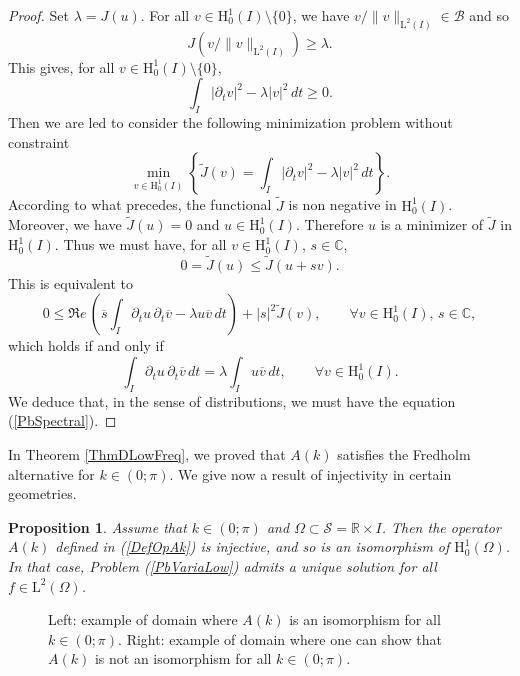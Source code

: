 \documentclass[11pt,a4paper]{report}
\newcommand{\Om}{\Omega}
\newcommand{\mrm}[1]{\mathrm{#1}}
\newcommand{\Cplx}{\mathbb{C}}
\newcommand{\R}{\mathbb{R}}
\newcommand{\mL}{\mrm{L}}
\newcommand{\mH}{\mrm{H}}
\newtheorem{proposition}[theorem]{Proposition}
\begin{document}
\begin{proof}
\newline
Set $\lambda=J(u)$. For all $v\in \mH^1_0(I)\setminus\{0\}$, we have $v/\|v\|_{\mL^2(I)}\in \mathscr{B}$ and so 
\[
J(v/\|v\|_{\mL^2(I)}) \ge \lambda.
\]
This gives, for all $v\in \mH^1_0(I)\setminus\{0\}$,
\[
\int_I |\partial_t v|^2 - \lambda  |v|^2\,dt \ge0.
\]
Then we are led to consider the following minimization problem without constraint 
\[
\min_{v\in \mH^1_0(I)}\left\{\tilde J(v)=\int_I |\partial_t v|^2 - \lambda  |v|^2\,dt\right\}.
\]
According to what precedes, the functional $\tilde J$ is non negative in $\mH^1_0(I)$. Moreover, we have $\tilde J(u)=0$ and $u\in \mH^1_0(I)$. Therefore $u$  is a minimizer of $\tilde J$ in $\mH^1_0(I)$. Thus we must have, for all $v\in \mH^1_0(I)$, $s\in\Cplx$,
\[
0=\tilde J(u) \le \tilde J(u+sv).
\]
This is equivalent to
\[
0 \le \Re e\,\left(\overline{s}\int_I \partial_t u\,\partial_t \overline{v}-\lambda   u\overline{v}\,dt\right)+|s|^2\tilde J(v),\qquad\forall v\in  \mH^1_0(I),\,s\in\Cplx,
\]
which holds if and only if
\[
\int_I \partial_t u\,\partial_t \overline{v}\,dt=\lambda\int_I   u\overline{v}\,dt,\qquad\forall v\in  \mH^1_0(I).
\]
We deduce that, in the sense of distributions, we must have the equation (\ref{PbSpectral}). 
\end{proof}

\noindent In Theorem \ref{ThmDLowFreq}, we proved that $A(k)$ satisfies the Fredholm alternative for $k\in(0;\pi)$. We give now a result of injectivity in certain geometries.

\begin{proposition}\label{PropInjD}
Assume that $k\in(0;\pi)$ and $\Om\subset \mathcal{S}=\R\times I$. Then the operator $A(k)$ defined in (\ref{DefOpAk}) is injective, and so is an isomorphism of $\mH^1_0(\Om)$. In that case, Problem (\ref{PbVariaLow}) admits a unique solution for all $f\in\mL^2(\Om)$.
\end{proposition}

\begin{figure}[!ht]
\centering
{}\qquad\quad
{}
\caption{Left: example of domain where $A(k)$ is an isomorphism for all $k\in(0;\pi)$. Right: example of domain where one can show that $A(k)$ is not an isomorphism for all $k\in(0;\pi)$.\label{PictureWaveguideInj}}
\end{figure}
\end{document}
